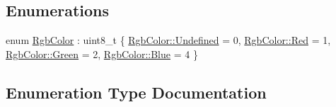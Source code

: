 \subsection*{Enumerations}
\begin{DoxyCompactItemize}
\item 
enum \hyperlink{namespaceGraphicalEditorCore_ada0d86f7dc1329a6731f908a95f68a38}{Rgb\+Color} \+: uint8\+\_\+t \{ \hyperlink{namespaceGraphicalEditorCore_ada0d86f7dc1329a6731f908a95f68a38aec0fc0100c4fc1ce4eea230c3dc10360}{Rgb\+Color\+::\+Undefined} = 0, 
\hyperlink{namespaceGraphicalEditorCore_ada0d86f7dc1329a6731f908a95f68a38aee38e4d5dd68c4e440825018d549cb47}{Rgb\+Color\+::\+Red} = 1, 
\hyperlink{namespaceGraphicalEditorCore_ada0d86f7dc1329a6731f908a95f68a38ad382816a3cbeed082c9e216e7392eed1}{Rgb\+Color\+::\+Green} = 2, 
\hyperlink{namespaceGraphicalEditorCore_ada0d86f7dc1329a6731f908a95f68a38a9594eec95be70e7b1710f730fdda33d9}{Rgb\+Color\+::\+Blue} = 4
 \}
\end{DoxyCompactItemize}


\subsection{Enumeration Type Documentation}
